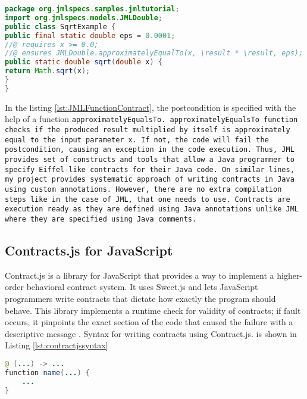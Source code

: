 \begin{minipage}{\linewidth}     
\begin{lstlisting}[frame=single, language=Java, caption={JML Contract Example with JML function \cite{leavens2006design} }, label={lst:JMLFunctionContract}, captionpos=b, breaklines=true]
package org.jmlspecs.samples.jmltutorial;
import org.jmlspecs.models.JMLDouble;
public class SqrtExample {
public final static double eps = 0.0001;
//@ requires x >= 0.0;
//@ ensures JMLDouble.approximatelyEqualTo(x, \result * \result, eps);
public static double sqrt(double x) {
return Math.sqrt(x);
}
}
\end{lstlisting}
\end{minipage}


In the listing \ref{lst:JMLFunctionContract}, the postcondition is specified with the help of a function \tt{approximatelyEqualsTo}. \tt{approximatelyEqualsTo} function checks if the produced result multiplied by itself is approximately equal to the input parameter x. If not, the code will fail the postcondition, causing an exception in the code execution. \linebreak
Thus, JML provides set of constructs and tools that allow a Java programmer to specify Eiffel-like contracts for their Java code. On similar lines, my project provides systematic approach of writing contracts in Java using custom annotations. However, there are no extra compilation steps like in the case of JML, that one needs to use. Contracts are execution ready as they are defined using Java annotations unlike JML where they are specified using Java comments.

\subsection{Contracts.js for JavaScript}

Contract.js is a library for JavaScript that provides a way to implement a higher-order behavioral contract system. It uses Sweet.js \cite{Contract11:online} and lets JavaScript programmers write contracts that dictate how exactly the program should behave. This library implements a runtime check for validity of contracts; if fault occurs, it pinpoints the exact section of the code that caused the failure with a descriptive message \cite{Contract11:online}.
Syntax for writing contracts using Contract.js. is shown in Listing \ref{lst:contractjssyntax}  \linebreak

\begin{minipage}{\linewidth}      
\begin{lstlisting}[frame=single, language=Java, caption={Contract.js syntax}, label={lst:contractjssyntax}, captionpos=b, breaklines=true]
@ (...) -> ...
function name(...) {
    ...
}
\end{lstlisting}
\end{minipage}


